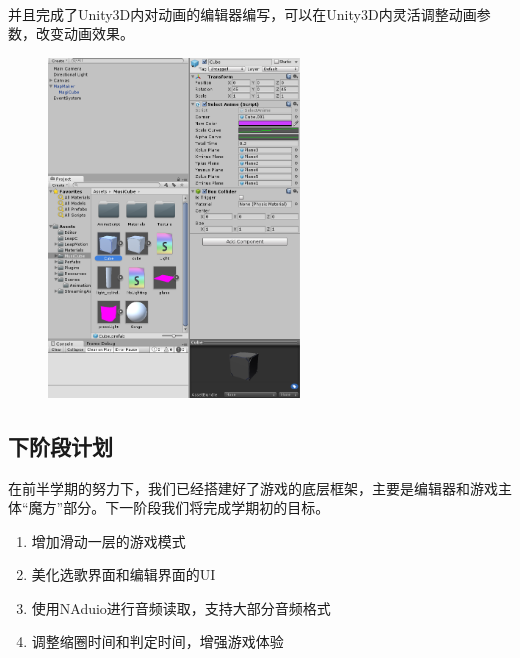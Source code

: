 \documentclass{article}
\begin{document}
\paragraph{}
并且完成了Unity3D内对动画的编辑器编写，可以在Unity3D内灵活调整动画参数，改变动画效果。
\begin{figure}[H]
  \centering
  \includegraphics[width=18em]{work1.png}\\
  \caption{}\label{}
\end{figure}
\newpage
\subsection{下阶段计划}
在前半学期的努力下，我们已经搭建好了游戏的底层框架，主要是编辑器和游戏主体“魔方”部分。下一阶段我们将完成学期初的目标。
\begin{enumerate}
  \item 增加滑动一层的游戏模式
  \item 美化选歌界面和编辑界面的UI
  \item 使用NAduio进行音频读取，支持大部分音频格式
  \item 调整缩圈时间和判定时间，增强游戏体验
\end{enumerate}
\end{document}
